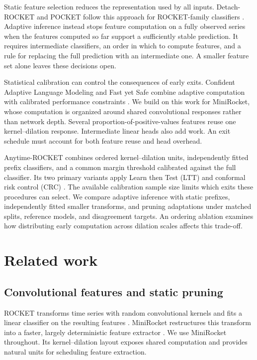 \documentclass[pdflatex,sn-basic,Numbered]{sn-jnl}
\begin{document}
Static feature selection reduces the representation used by all inputs. Detach-ROCKET and POCKET follow this approach for ROCKET-family classifiers \cite{detach,pocket}. Adaptive inference instead stops feature computation on a fully observed series when the features computed so far support a sufficiently stable prediction. It requires intermediate classifiers, an order in which to compute features, and a rule for replacing the full prediction with an intermediate one. A smaller feature set alone leaves these decisions open.

Statistical calibration can control the consequences of early exits. Confident Adaptive Language Modeling and Fast yet Safe combine adaptive computation with calibrated performance constraints \cite{calm,fastsafe}. We build on this work for MiniRocket, whose computation is organized around shared convolutional responses rather than network depth. Several proportion-of-positive-values features reuse one kernel--dilation response. Intermediate linear heads also add work. An exit schedule must account for both feature reuse and head overhead.

Anytime-ROCKET combines ordered kernel--dilation units, independently fitted prefix classifiers, and a common margin threshold calibrated against the full classifier. Its two primary variants apply Learn then Test (LTT) and conformal risk control (CRC) \cite{ltt,crc}. The available calibration sample size limits which exits these procedures can select. We compare adaptive inference with static prefixes, independently fitted smaller transforms, and pruning adaptations under matched splits, reference models, and disagreement targets. An ordering ablation examines how distributing early computation across dilation scales affects this trade-off.

\section{Related work}\label{sec:related}
\subsection{Convolutional features and static pruning}
ROCKET transforms time series with random convolutional kernels and fits a linear classifier on the resulting features \cite{rocket}. MiniRocket restructures this transform into a faster, largely deterministic feature extractor \cite{minirocket}. We use MiniRocket throughout. Its kernel--dilation layout exposes shared computation and provides natural units for scheduling feature extraction.
\end{document}
